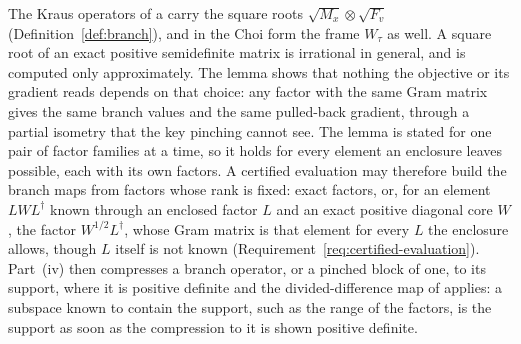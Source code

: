 
The Kraus operators of a  carry the square roots
$\sqrt{M_x}\otimes\sqrt{F_v}$ (Definition~\ref{def:branch}), and in the Choi
form the frame $W_{\tau}$ as well. A square root of an exact positive
semidefinite matrix is irrational in general, and is computed only
approximately. The lemma shows that nothing the objective or its gradient
reads depends on that choice: any factor with the same Gram matrix gives the
same branch values and the same pulled-back gradient, through a partial
isometry that the key pinching cannot see. The lemma is stated for one pair
of factor families at a time, so it holds for every element an enclosure
leaves possible, each with its own factors. A certified evaluation may
therefore build the branch maps from factors whose rank is fixed: exact
factors, or, for an element $LWL^{\dagger}$ known through an enclosed factor
$L$ and an exact positive diagonal core $W$, the factor $W^{1/2}L^{\dagger}$,
whose Gram matrix is that element for every $L$ the enclosure allows, though
$L$ itself is not known (Requirement~\ref{req:certified-evaluation}).
Part~(iv) then
compresses a branch operator, or a pinched block of one, to its support,
where it is positive definite and the divided-difference map of
 applies: a subspace known
to contain the support, such as the range of the factors, is the support as
soon as the compression to it is shown positive definite.

